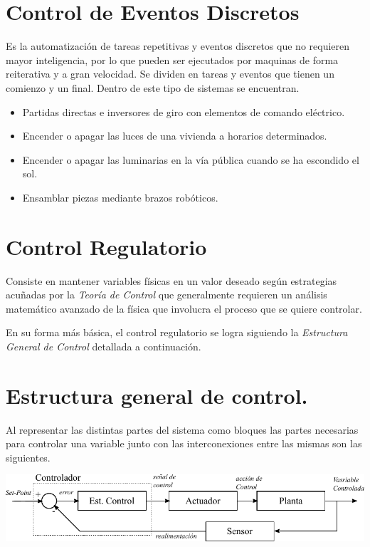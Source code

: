 \documentclass[letterpaper,journal]{ieeetran}
\begin{document}
\begin{itemize}
	\section{Control de Eventos Discretos}
	Es la automatización de tareas repetitivas y eventos discretos que no requieren mayor inteligencia, por lo que pueden ser ejecutados por maquinas de forma reiterativa y a gran velocidad. Se dividen en tareas y eventos que tienen un comienzo y un final. Dentro de este tipo de sistemas se encuentran.
	\begin{itemize}
		\item Partidas directas e inversores de giro con elementos de comando eléctrico.
		\item Encender o apagar las luces de una vivienda a horarios determinados.
		\item Encender o apagar las luminarias en la vía pública cuando se ha escondido el sol.
		\item Ensamblar piezas mediante brazos robóticos.
	\end{itemize}	
	
	\section{Control Regulatorio}
	
	Consiste en mantener variables físicas en un valor deseado según estrategias acuñadas por la \emph{Teoría de Control} que generalmente requieren un análisis matemático avanzado de la física que involucra el proceso que se quiere controlar.
	
	En su forma más básica, el control regulatorio se logra siguiendo la \emph{Estructura General de Control} detallada a continuación.
	
	\section[Control Regulatorio]{Estructura general de control.}
	Al representar las distintas partes del sistema como bloques las partes necesarias para controlar una variable junto con las interconexiones entre las mismas son las siguientes. 
	
	\begin{center}
		\includegraphics[scale=0.6]{egControl.pdf}
	\end{center}

\end{itemize}
\end{document}
